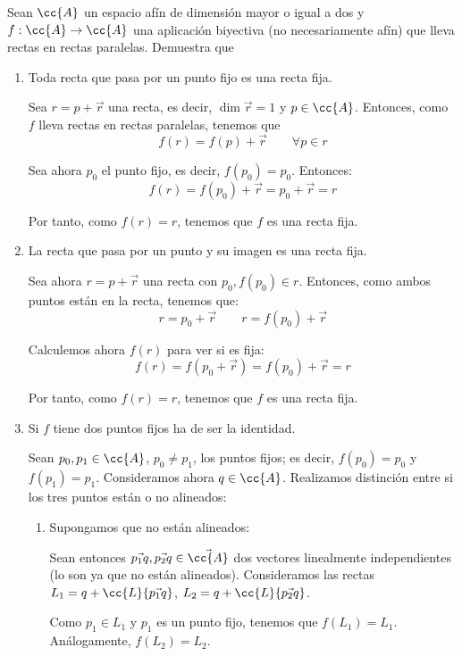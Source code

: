 \begin{ejercicio}
    Sean $\cc{A}$ un espacio afín de dimensión mayor o igual a dos y $f : \cc{A} \to \cc{A}$ una aplicación biyectiva (no necesariamente afín) que lleva rectas en rectas paralelas. Demuestra que
    \begin{enumerate}
        \item Toda recta que pasa por un punto fijo es una recta fija.

        Sea $r=p+\vec{r}$ una recta, es decir, $\dim \vec{r}=1$ y $p\in \cc{A}$. Entonces, como $f$ lleva rectas en rectas paralelas, tenemos que $$f(r)=f(p)+\vec{r} \qquad \forall p\in r$$

        Sea ahora $p_0$ el punto fijo, es decir, $f(p_0)=p_0$. Entonces:
        $$f(r)=f(p_0)+\vec{r}=p_0+\vec{r}=r$$

        Por tanto, como $f(r)=r$, tenemos que $f$ es una recta fija.

        
        \item La recta que pasa por un punto y su imagen es una recta fija.

        Sea ahora $r=p+\vec{r}$ una recta con $p_0,f(p_0)\in r$. Entonces, como ambos puntos están en la recta, tenemos que:
        $$r=p_0+\vec{r} \qquad r=f(p_0)+\vec{r}$$

        Calculemos ahora $f(r)$ para ver si es fija:
        \begin{equation*}
            f(r)=f(p_0+\vec{r})=f(p_0)+\vec{r}=r
        \end{equation*}

        Por tanto, como $f(r)=r$, tenemos que $f$ es una recta fija.
        
        \item Si $f$ tiene dos puntos fijos ha de ser la identidad.

        Sean $p_0,p_1\in \cc{A}$, $p_0\neq p_1$, los puntos fijos; es decir, $f(p_0)=p_0$ y $f(p_1)=p_1$. Consideramos ahora $q\in \cc{A}$. Realizamos distinción entre si los tres puntos están o no alineados:
        \begin{enumerate}
            \item Supongamos que no están alineados:

            Sean entonces $\vec{p_1q}, \vec{p_2q}\in \vec{\cc{A}}$ dos vectores linealmente independientes (lo son ya que no están alineados). Consideramos las rectas $L_1 = q+\cc{L}\{\vec{p_1q}\}$, $L_2 = q+\cc{L}\{\vec{p_2q}\}$.

            Como $p_1\in L_1$ y $p_1$ es un punto fijo, tenemos que $f(L_1)=L_1$. Análogamente, $f(L_2)=L_2$.


\end{enumerate}
\end{enumerate}
\end{ejercicio}
